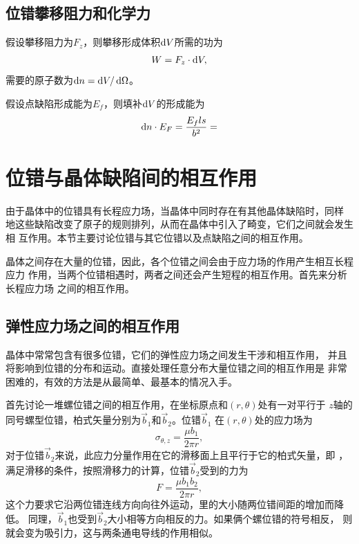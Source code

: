                 \subsection{位错攀移阻力和化学力}
                    假设攀移阻力为$F_z$，则攀移形成体积$\mathop{}\!\mathrm{d} V$所需的功为
                    \begin{equation}
                        W=F_z\cdot\mathop{}\!\mathrm{d} V,
                    \end{equation}
                    需要的原子数为$\mathop{}\!\mathrm{d} n=\mathop{}\!\mathrm{d} V/\mathop{}\!\mathrm{d} \Omega$。

                    假设点缺陷形成能为$E_f$，则填补$\mathop{}\!\mathrm{d} V$的形成能为
                    \begin{equation}
                        \mathop{}\!\mathrm{d} n\cdot E_F=\frac{E_f ls}{b^2}=
                    \end{equation}
        \section{位错与晶体缺陷间的相互作用}
            由于晶体中的位错具有长程应力场，当晶体中同时存在有其他晶体缺陷时，同样
            地这些缺陷改变了原子的规则排列，从而在晶体中引入了畸变，它们之间就会发生相
            互作用。本节主要讨论位错与其它位错以及点缺陷之间的相互作用。
            
            晶体之间存在大量的位错，因此，各个位错之间会由于应力场的作用产生相互长程应力
            作用，当两个位错相遇时，两者之间还会产生短程的相互作用。首先来分析长程应力场
            之间的相互作用。
            \subsection{弹性应力场之间的相互作用}
                    晶体中常常包含有很多位错，它们的弹性应力场之间发生干涉和相互作用，
                    并且将影响到位错的分布和运动。直接处理任意分布大量位错之间的相互作用是
                    非常困难的，有效的方法是从最简单、最基本的情况入手。

                    首先讨论一堆螺位错之间的相互作用，在坐标原点和$(r,\theta)$处有一对平行于
                    $z$轴的同号螺型位错，柏式矢量分别为$\vec{b}_1$和$\vec{b}_2$。位错$\vec{b}_1$
                    在$(r,\theta)$处的应力场为
                    \begin{equation}
                        \sigma_{\theta,z}=\frac{\mu b_1}{2\pi r},
                    \end{equation}
                    对于位错$\vec{b}_2$来说，此应力分量作用在它的滑移面上且平行于它的柏式矢量，即
                    ，满足滑移的条件，按照滑移力的计算，位错$\vec{b}_2$受到的力为
                    \begin{equation}
                        F=\frac{\mu b_1 b_2}{2\pi r}\label{两个螺型位错之间的作用力},    
                    \end{equation}
                    这个力要求它沿两位错连线方向向往外运动，里的大小随两位错间距的增加而降低。
                    同理，$\vec{b}_1$也受到$\vec{b}_2$大小相等方向相反的力。如果俩个螺位错的符号相反，
                    则就会变为吸引力，这与两条通电导线的作用相似。
                    
